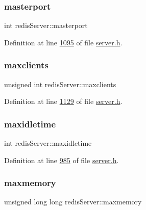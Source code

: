 \subsubsection{\texorpdfstring{masterport}{masterport}}
{\footnotesize\ttfamily int redis\+Server\+::masterport}



Definition at line \hyperlink{server_8h_source_l01095}{1095} of file \hyperlink{server_8h_source}{server.\+h}.

\mbox{\label{structredisServer_ad61570a534b33fddc40435d087b15628}} 
\subsubsection{\texorpdfstring{maxclients}{maxclients}}
{\footnotesize\ttfamily unsigned int redis\+Server\+::maxclients}



Definition at line \hyperlink{server_8h_source_l01129}{1129} of file \hyperlink{server_8h_source}{server.\+h}.

\mbox{\label{structredisServer_ac4ed36b4838bcdbddc23f30f276329e9}} 
\subsubsection{\texorpdfstring{maxidletime}{maxidletime}}
{\footnotesize\ttfamily int redis\+Server\+::maxidletime}



Definition at line \hyperlink{server_8h_source_l00985}{985} of file \hyperlink{server_8h_source}{server.\+h}.

\mbox{\label{structredisServer_a4b8bb708b39d5495b6b465d041229186}} 
\subsubsection{\texorpdfstring{maxmemory}{maxmemory}}
{\footnotesize\ttfamily unsigned long long redis\+Server\+::maxmemory}



